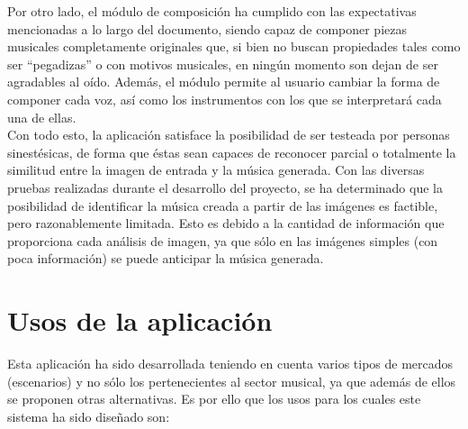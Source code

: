 Por otro lado, el módulo de composición ha cumplido con las expectativas mencionadas a lo largo del documento, siendo capaz de componer piezas musicales completamente originales que, si bien no buscan propiedades tales como ser ``pegadizas'' o con motivos musicales, en ningún momento son dejan de ser agradables al oído. Además, el módulo permite al usuario cambiar la forma de componer cada voz, así como los instrumentos con los que se interpretará cada una de ellas.\\

Con todo esto, la aplicación satisface la posibilidad de ser testeada por personas sinestésicas, de forma que éstas sean capaces de reconocer parcial o totalmente la similitud entre la imagen de entrada y la música generada. Con las diversas pruebas realizadas durante el desarrollo del proyecto, se ha determinado que la posibilidad de identificar la música creada a partir de las imágenes es factible, pero razonablemente limitada. Esto es debido a la cantidad de información que proporciona cada análisis de imagen, ya que sólo en las imágenes simples (con poca información) se puede anticipar la música generada.\\


\section{Usos de la aplicación}
\label{sec:usos}

Esta aplicación ha sido desarrollada teniendo en cuenta varios tipos de mercados (escenarios) y no sólo los pertenecientes al sector musical, ya que además de ellos se proponen otras alternativas. Es por ello que los usos para los cuales este sistema ha sido diseñado son:

